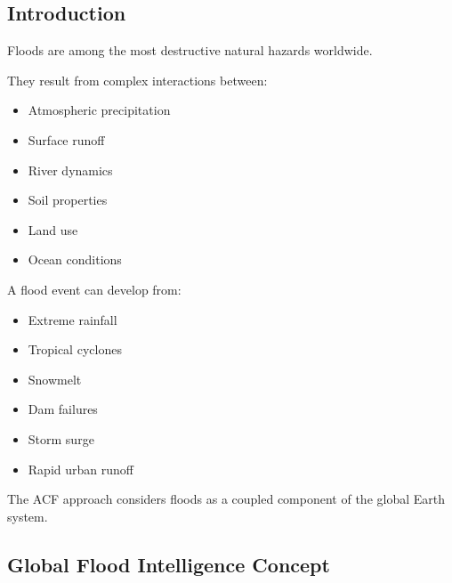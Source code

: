 
\subsection{Introduction}

Floods are among the most destructive natural hazards worldwide.

They result from complex interactions between:

\begin{itemize}

\item Atmospheric precipitation

\item Surface runoff

\item River dynamics

\item Soil properties

\item Land use

\item Ocean conditions

\end{itemize}


A flood event can develop from:

\begin{itemize}

\item Extreme rainfall

\item Tropical cyclones

\item Snowmelt

\item Dam failures

\item Storm surge

\item Rapid urban runoff

\end{itemize}


The ACF approach considers floods as a coupled component of the global
Earth system.


\subsection{Global Flood Intelligence Concept}

